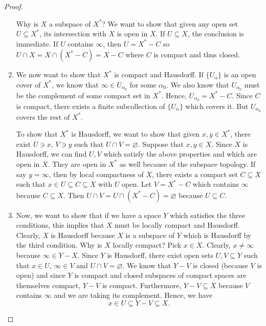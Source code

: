 \documentclass{article}
\newcommand{\nline}{\vspace*{0.5\baselineskip}}
\theoremstyle{definition}
\begin{document}
\begin{flushleft}
\begin{proof}
\begin{enumerate}
    Why is $X$ a subspace of $X^*$? We want to show that given any open set $U \subseteq X^*$, its intersection with $X$ is open in $X$. If $U \subseteq X$, the conclusion is immediate. If $U$ contains $\infty$, then $U = X^* - C$ so $U \cap X = X \cap (X^* - C) = X - C$ where $C$ is compact and thus closed.
    \item We now want to show that $X^*$ is compact and Hausdorff. If $\{U_\alpha\}$ is an open cover of $X^*$, we know that $\infty \in U_{\alpha_0}$ for some $\alpha_0$. We also know that $U_{\alpha_0}$ must be the complement of some compact set in $X^*$. Hence, $U_{\alpha_0} = X^* - C$. Since $C$ is compact, there exists a finite subcollection of $\{U_\alpha\}$ which covers it. But $U_{\alpha_0}$ covers the rest of $X^*$.

    \nline

    To show that $X^*$ is Hausdorff, we want to show that given $x,y \in X^*$, there exist $U \ni x$, $V \ni y$ such that $U \cap V = \varnothing$. Suppose that $x,y \in X$. Since $X$ is Hausdorff, we can find $U, V$ which satisfy the above properties and which are open in $X$. They are open in $X^*$ as well because of the subspace topology. If say $y = \infty$, then by local compactness of $X$, there exists a compact set $C \subseteq X$ such that $x \in U \subseteq C \subseteq X$ with $U$ open. Let $V = X^* - C$ which contains $\infty$ because $C \subseteq X$. Then $U \cap V = U \cap (X^* - C) = \varnothing$ because $U \subseteq C$.

    \item Now, we want to show that if we have a space $Y$ which satisfies the three conditions, this implies that $X$ must be locally compact and Hausdorff. Clearly, $X$ is Hausdorff because $X$ is a subspace of $Y$ which is Hausdorff by the third condition. Why is $X$ locally compact? Pick $x \in X$. Clearly, $x \neq \infty$ because $\infty \in Y - X$. Since $Y$ is Hausdorff, there exist open sets $U, V \subseteq Y$ such that $x \in U$, $\infty \in V$ and $U \cap V = \varnothing$. We know that $Y - V$ is closed (because $V$ is open) and since $Y$ is compact and closed subspaces of compact spaces are themselves compact, $Y - V$ is compact. Furthermore, $Y - V \subseteq X$ because $V$ contains $\infty$ and we are taking its complement. Hence, we have
    \[
    x \in U \subseteq Y - V \subseteq X.
    \]


\end{enumerate}
\end{proof}
\end{flushleft}
\end{document}
